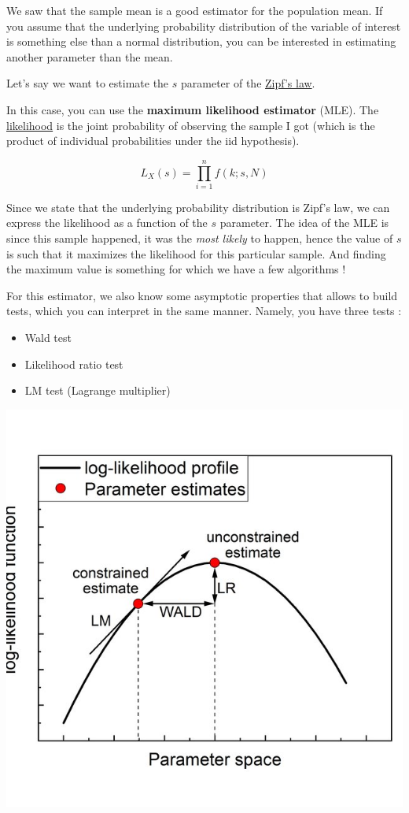 \documentclass[
]{book}
\providecommand{\tightlist}{%
  \setlength{\itemsep}{0pt}\setlength{\parskip}{0pt}}
\begin{document}
We saw that the sample mean is a good estimator for the population mean. If you assume that the underlying probability distribution of the variable of interest is something else than a normal distribution, you can be interested in estimating another parameter than the mean.

Let's say we want to estimate the \(s\) parameter of the \href{https://en.wikipedia.org/wiki/Zipf\%27s_law}{Zipf's law}.

In this case, you can use the \textbf{maximum likelihood estimator} (MLE). The \href{https://en.wikipedia.org/wiki/Likelihood_function}{likelihood} is the joint probability of observing the sample I got (which is the product of individual probabilities under the iid hypothesis).

\[L_X(s) = \prod_{i=1}^n f(k;s,N)\]

Since we state that the underlying probability distribution is Zipf's law, we can express the likelihood as a function of the \(s\) parameter. The idea of the MLE is since this sample happened, it was the \emph{most likely} to happen, hence the value of \(s\) is such that it maximizes the likelihood for this particular sample. And finding the maximum value is something for which we have a few algorithms !

For this estimator, we also know some asymptotic properties that allows to build tests, which you can interpret in the same manner. Namely, you have three tests :

\begin{itemize}
\tightlist
\item
  Wald test
\item
  Likelihood ratio test
\item
  LM test (Lagrange multiplier)
\end{itemize}

\includegraphics{img/wald-lm-lr.jpg}
\end{document}
